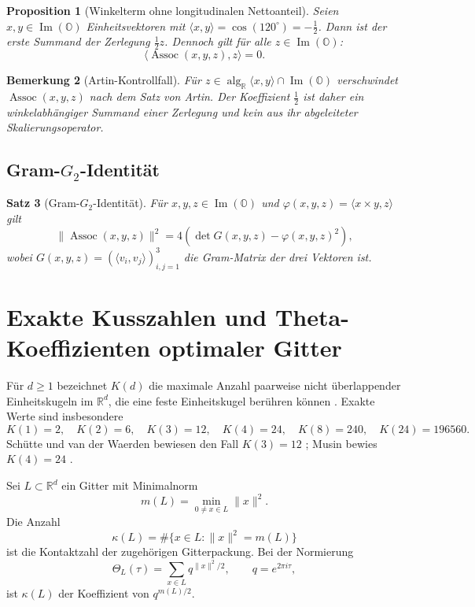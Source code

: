 \documentclass[11pt,a4paper]{article}
\newtheorem{theorem}{Satz}[section]
\newtheorem{proposition}[theorem]{Proposition}
\newtheorem{remark}[theorem]{Bemerkung}
\newcommand{\ImO}{\operatorname{Im}(\mathbb{O})}
\newcommand{\Assoc}{\operatorname{Assoc}}
\begin{document}
\begin{proposition}[Winkelterm ohne longitudinalen Nettoanteil]
Seien $x,y\in\ImO$ Einheitsvektoren mit $\langle x,y\rangle=\cos(120^\circ)=-\tfrac12$. Dann ist der erste Summand der Zerlegung $\tfrac12z$. Dennoch gilt für alle $z\in\ImO$:
\[
\langle\Assoc(x,y,z),z\rangle=0.
\]
\end{proposition}

\begin{remark}[Artin-Kontrollfall]
Für $z\in\operatorname{alg}_{\mathbb{R}}\langle x,y\rangle\cap\ImO$ verschwindet $\Assoc(x,y,z)$ nach dem Satz von Artin. Der Koeffizient $\tfrac12$ ist daher ein winkelabhängiger Summand einer Zerlegung und kein aus ihr abgeleiteter Skalierungsoperator.
\end{remark}

\subsection{Gram-$G_2$-Identität}
\begin{theorem}[Gram-$G_2$-Identität]
Für $x,y,z\in\ImO$ und $\varphi(x,y,z)=\langle x\times y,z\rangle$ gilt \cite{harvey}
\begin{equation}
\|\Assoc(x,y,z)\|^2=4\left(\det G(x,y,z)-\varphi(x,y,z)^2\right),
\end{equation}
wobei $G(x,y,z)=(\langle v_i,v_j\rangle)_{i,j=1}^3$ die Gram-Matrix der drei Vektoren ist.
\end{theorem}

\section{Exakte Kusszahlen und Theta-Koeffizienten optimaler Gitter}
Für $d\ge1$ bezeichnet $K(d)$ die maximale Anzahl paarweise nicht überlappender Einheitskugeln im $\mathbb{R}^d$, die eine feste Einheitskugel berühren können \cite{conway}. Exakte Werte sind insbesondere
\[
K(1)=2,\quad K(2)=6,\quad K(3)=12,\quad K(4)=24,\quad K(8)=240,\quad K(24)=196560.
\]
Schütte und van der Waerden bewiesen den Fall $K(3)=12$ \cite{schuette}; Musin bewies $K(4)=24$ \cite{musin}.

Sei $L\subset\mathbb{R}^d$ ein Gitter mit Minimalnorm
\[
m(L)=\min_{0\neq x\in L}\|x\|^2.
\]
Die Anzahl
\[
\kappa(L)=\#\{x\in L:\|x\|^2=m(L)\}
\]
ist die Kontaktzahl der zugehörigen Gitterpackung. Bei der Normierung
\[
\Theta_L(\tau)=\sum_{x\in L}q^{\|x\|^2/2},\qquad q=e^{2\pi i\tau},
\]
ist $\kappa(L)$ der Koeffizient von $q^{m(L)/2}$.
\end{document}
